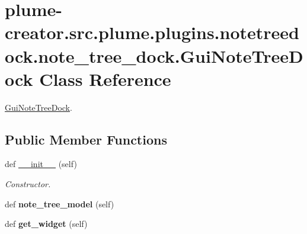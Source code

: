 \hypertarget{classplume-creator_1_1src_1_1plume_1_1plugins_1_1notetreedock_1_1note__tree__dock_1_1_gui_note_tree_dock}{}\section{plume-\/creator.src.\+plume.\+plugins.\+notetreedock.\+note\+\_\+tree\+\_\+dock.\+Gui\+Note\+Tree\+Dock Class Reference}
\label{classplume-creator_1_1src_1_1plume_1_1plugins_1_1notetreedock_1_1note__tree__dock_1_1_gui_note_tree_dock}


\hyperlink{classplume-creator_1_1src_1_1plume_1_1plugins_1_1notetreedock_1_1note__tree__dock_1_1_gui_note_tree_dock}{Gui\+Note\+Tree\+Dock}.  


\subsection*{Public Member Functions}
\begin{DoxyCompactItemize}
\item 
def \hyperlink{classplume-creator_1_1src_1_1plume_1_1plugins_1_1notetreedock_1_1note__tree__dock_1_1_gui_note_tree_dock_af9bfeea37bfe70939081f909d657b262}{\+\_\+\+\_\+init\+\_\+\+\_\+} (self)\hypertarget{classplume-creator_1_1src_1_1plume_1_1plugins_1_1notetreedock_1_1note__tree__dock_1_1_gui_note_tree_dock_af9bfeea37bfe70939081f909d657b262}{}\label{classplume-creator_1_1src_1_1plume_1_1plugins_1_1notetreedock_1_1note__tree__dock_1_1_gui_note_tree_dock_af9bfeea37bfe70939081f909d657b262}

\begin{DoxyCompactList}\small\item\em Constructor. \end{DoxyCompactList}\item 
def {\bfseries note\+\_\+tree\+\_\+model} (self)\hypertarget{classplume-creator_1_1src_1_1plume_1_1plugins_1_1notetreedock_1_1note__tree__dock_1_1_gui_note_tree_dock_a4835d5a96b46819ce671950b90a7ab21}{}\label{classplume-creator_1_1src_1_1plume_1_1plugins_1_1notetreedock_1_1note__tree__dock_1_1_gui_note_tree_dock_a4835d5a96b46819ce671950b90a7ab21}

\item 
def {\bfseries get\+\_\+widget} (self)\hypertarget{classplume-creator_1_1src_1_1plume_1_1plugins_1_1notetreedock_1_1note__tree__dock_1_1_gui_note_tree_dock_aba899b9f6c83eb663c70dd901286148b}{}\label{classplume-creator_1_1src_1_1plume_1_1plugins_1_1notetreedock_1_1note__tree__dock_1_1_gui_note_tree_dock_aba899b9f6c83eb663c70dd901286148b}

\end{DoxyCompactItemize}
